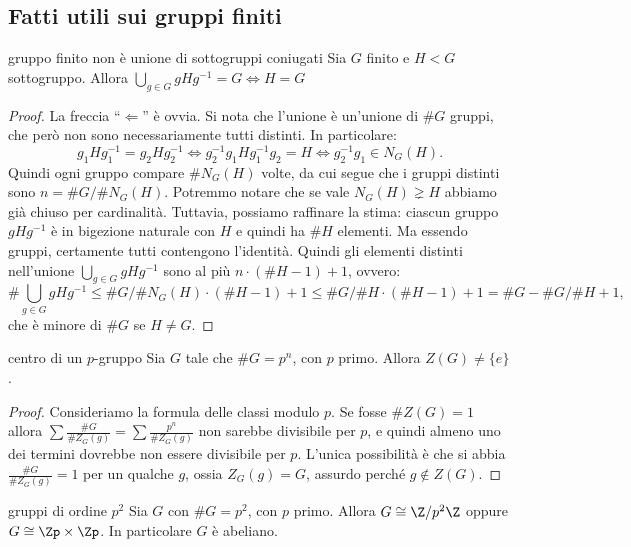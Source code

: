 \hypertarget{gruppi finiti}{
\subsection{Fatti utili sui gruppi finiti}
}
\hypertarget{es1}{
\begin{proposition}{gruppo finito non è unione di sottogruppi coniugati}
    Sia $G$ finito e $H <G$ sottogruppo. Allora $\bigcup_{g \in G} gHg^{-1} = G \iff H = G$
\end{proposition}
}
\begin{proof}
    La freccia ``$\Leftarrow$'' è ovvia. Si nota che l'unione è un'unione di $\# G $ gruppi, che però non sono necessariamente tutti distinti. In particolare:
    \[
    g_1 H g_1^{-1} = g_2 H g_2^{-1} \iff g_2^{-1}g_1 H g_1^{-1}g_2 = H \iff g_2^{-1}g_1 \in N_G(H).
    \]
    Quindi ogni gruppo compare $\# N_G(H)$ volte, da cui segue che i gruppi distinti sono $n = \#G / \#N_G(H)$. Potremmo notare che se vale $N_G(H) \gneq H $ abbiamo già chiuso per cardinalità. Tuttavia, possiamo raffinare la stima: ciascun gruppo $gHg^{-1}$ è in bigezione naturale con $H$ e quindi ha $\#H$ elementi. Ma essendo gruppi, certamente tutti contengono l'identità. Quindi gli elementi distinti nell'unione $\bigcup_{g \in G} gHg^{-1}$ sono al più $n\cdot(\#H -1) + 1$, ovvero:
    \[
    \#\bigcup_{g \in G} gHg^{-1} \leq \#G / \#N_G(H) \cdot (\#H -1) + 1 \leq \#G / \#H \cdot (\#H -1) + 1 = \#G - \#G / \#H + 1,
    \]
    che è minore di $\#G$ se $H \neq G$. 
\end{proof}
\begin{proposition}{centro di un $p$-gruppo}
    Sia $G$ tale che $\#G = p^n$, con $p$ primo. Allora $Z(G) \neq \{e\}$.
\end{proposition}
\begin{proof}
    Consideriamo la formula delle classi modulo $p$. Se fosse $\#Z(G) = 1$ allora $\sum \frac{\#G}{\#Z_G(g)} = \sum \frac{p^n}{\#Z_G(g)}$ non sarebbe divisibile per $p$, e quindi almeno uno dei termini dovrebbe non essere divisibile per $p$. L'unica possibilità è che si abbia $\frac{\#G}{\#Z_G(g)} = 1$ per un qualche $g$, ossia $Z_G(g) = G$, assurdo perché $g \notin Z(G)$.
\end{proof}
\begin{proposition}{gruppi di ordine $p^2$}
    Sia $G$ con $\#G = p^2$, con $p$ primo. Allora $G \cong \Z/p^2\Z$ oppure $G \cong \Zp \times \Zp$. In particolare $G$ è abeliano.
\end{proposition}
